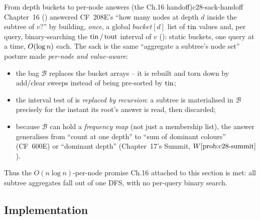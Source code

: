 \begin{proposition}{From depth buckets to per-node answers (the Ch.16 handoff)}{c28-sack-handoff}
Chapter~16 () answered CF~208E's ``how many nodes at depth \(d\)
inside the subtree of \(v\)?'' by building, \emph{once}, a global
\(\mathit{bucket}[d]\) list of \(\operatorname{tin}\) values and, per query, binary-searching
the \(\operatorname{tin}/\operatorname{tout}\) interval of \(v\) (): static buckets,
one query at a time, \(O(\log n)\) each.  The sack is the same
``aggregate a subtree's node set'' posture made \emph{per-node and value-aware}:
\begin{itemize}[nosep,leftmargin=1.4em]
  \item the bag \(\mathcal{B}\) replaces the bucket arrays -- it is rebuilt and
        torn down by add/clear sweeps instead of being pre-sorted by \(\operatorname{tin}\);
  \item the interval test of  is \emph{replaced by
        recursion}: a subtree is materialised in \(\mathcal{B}\) precisely for
        the instant its root's answer is read, then discarded;
  \item because \(\mathcal{B}\) can hold a \emph{frequency map} (not just a
        membership list), the answer generalises from ``count at one depth'' to
        ``sum of dominant colours'' (CF~600E) or ``dominant depth''
        (Chapter~17's Summit, \(\probref{c28-summit}\)).
\end{itemize}
Thus the \(O(n\log n)\)-per-node promise Ch.16 attached to this section is met:
all subtree aggregates fall out of one DFS, with no per-query binary search.
\end{proposition}

\subsection{Implementation}

